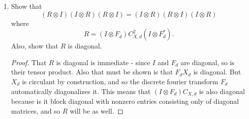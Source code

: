 \documentclass{article}
\begin{document}
\begin{enumerate}
\begin{proof}
      Since $A^{20} = 1,$ by lemma 14.3 and linearity \[\langle \mu\omega\rangle = \dfrac{-\mu\overline G}{2A^{-28}(A^2-A^{-2})}\]
      with $G = \sum_{n=1}^{20}A^{n^2}.$ For $r=5$, we also have that \[\omega = \sum_{n=0}^{r-2}\Delta_nS_n(\alpha) =\Delta_0 + \Delta_1\alpha + \Delta_2(\alpha^2-1) + \Delta_3(\alpha^3-2\alpha)\]
      or rearranging terms:
      \[\omega = \Delta_0\alpha^0 + (\Delta_1-2\Delta_3)\alpha^1 + \Delta_2\alpha^2+\Delta_3\alpha^3.\]
      We then calculate $\langle\mu\omega\rangle_{3_1}$ linearly. First, $\langle \mu\Delta_0\alpha^0\rangle = 0$ as the empty diagram. Similarly, $\mu(\Delta_1-2\Delta_3)\langle\alpha\rangle = \mu(\Delta_1-2\Delta_3)\langle 3_1\rangle$ the Kaufman bracket of $3_1.$ This is known to be given by $\langle 3_1 \rangle = -A^5-A^{-3}-A^{-7}.$
      \end{proof}
    \item Show that \[(R\otimes I)(I\otimes R)(R\otimes I) = (I\otimes R)(R\otimes I)(I\otimes R)\] where \[R = (I\otimes F_d)C_{X,d}^2(I\otimes F^*_d).\]
      Also, show that $R$ is diagonal. 
      \begin{proof}
        That $R$ is diagonal is immediate - since $I$ and $F_d$ are diagonal, so is their tensor product. Also that must be shown is that $F_dX_d$ is diagonal. But $X_d$ is circulant by construction, and so the discrete fourier transform $F_d$ automatically diagonalizes it. This means that $(I\otimes F_d)C_{X,d}$ is also diagonal because is it block diagonal with nonzero entries consisting only of diagonal matrices, and so $R$ will be as well.\smallskip


      \end{proof}
\end{enumerate}
\end{document}
